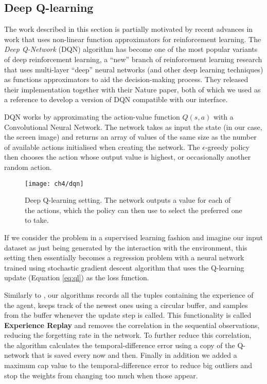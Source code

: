 \subsection{Deep Q-learning}

The work described in this section is partially motivated by recent advances in
work that uses non-linear function approximators for reinforcement learning. The
\emph{Deep Q-Network} (DQN) algorithm \citep{mnih2013playing, mnih2015human} has
become one of the most popular variants of deep reinforcement learning, a
``new'' branch of reinforcement learning research that uses multi-layer ``deep''
neural networks (and other deep learning techniques) as functions approximators
to aid the decision-making process. They released their implementation together
with their Nature paper, both of which we used as a reference to develop a
version of DQN compatible with our interface.

DQN works by approximating the action-value function $Q(s, a)$ with a
Convolutional Neural Network. The network takes as input the state (in our case,
the screen image) and returns an array of values of the same size as the number
of available actions initialised when creating the network. The
$\epsilon$-greedy policy then chooses the action whose output value is highest,
or occasionally another random action.

\begin{figure}[h]
    \centering
    \texttt{[image: ch4/dqn]}
    \caption{Deep Q-learning setting. The network outputs a value for each of
      the actions, which the policy can then use to select the preferred
      one to take.}
    \label{fig:dqn}
\end{figure}

If we consider the problem in a supervised learning fashion and imagine our
input dataset as just being generated by the interaction with the environment,
this setting then essentially becomes a regression problem with a neural
network trained using stochastic gradient descent algorithm that uses the
Q-learning update (Equation \ref{eq:ql}) as the loss function.


Similarly to \cite{mnih_et_al}, our algorithms records all the tuples containing
the experience of the agent, keeps track of the newest ones using a circular
buffer, and samples from the buffer whenever the update step is called. This
functionality is called \textbf{Experience Replay} and removes the correlation
in the sequential observations, reducing the forgetting rate in the network. To
further reduce this correlation, the algorithm calculates the
temporal-difference error using a copy of the Q-network that is saved every now
and then. Finally in addition we added a maximum cap value to the
temporal-difference error to reduce big outliers and stop the weights from
changing too much when those appear.

